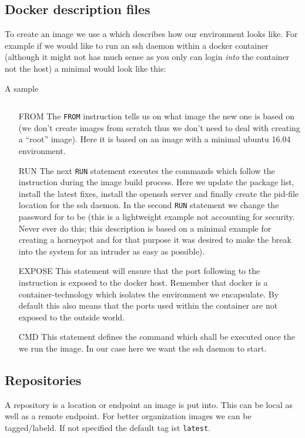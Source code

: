 		\subsection{Docker description files}
		To create an image we use a \emph{\dockerfile{}} which describes how our environment looks like. For example if we would like to run an ssh daemon within a docker container (although it might not has much sense as you only can login \emph{into} the container not the host) a minimal \dockerfile{} would look like this:
		\begin{listing}[H]
			\caption{A sample \dockerfile{}}
			\label{lst:p01:ch05:sample_dockerfile}
			\inputminted{text}{\relative{chapter_04/section_5.1.2/Dockerfile}}
		\end{listing}
		\begin{itemize}
			\item[FROM] The \texttt{FROM} instruction tells us on what image the new one is based on (we don't create images from scratch thus we don't need to deal with creating a ``root'' image). Here it is based on an image with a minimal ubuntu 16.04 environment. 
			\item[RUN] The next \texttt{RUN} statement executes the commands which follow the instruction during the image build process. Here we update the package list, install the latest fixes, install the openssh server and finally create the pid-file location for the ssh daemon. In the second \texttt{RUN} statement we change the password for \rootuser{} to be \rootuser{} (this is a lightweight example not accounting for security. Never ever do this; this description is based on a minimal example for creating a horneypot and for that purpose it was desired to make the break into the system for an intruder as easy as possible).
			\item[EXPOSE] This statement will ensure that the port following to the instruction is exposed to the docker host. Remember that docker is a container-technology which isolates the environment we encapsulate. By default this also means that the ports used within the container are not exposed to the outside world.
			\item[CMD] This statement defines the command which shall be executed once the we run the image. In our case here we want the ssh daemon to start.
		\end{itemize}

		\subsection{Repositories}
		A repository is a location or endpoint an image is put into. This can be local as well as a remote endpoint. For better organization images we can be tagged/labeld. If not specified the default tag ist \texttt{latest}.
